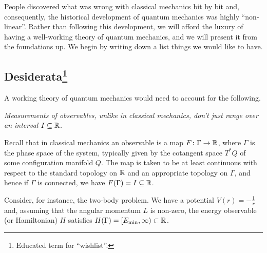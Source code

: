 
People discovered what was wrong with classical mechanics bit by bit and, consequently, the historical development of quantum mechanics was highly ``non-linear''. Rather than following this development, we will afford the luxury of having a well-working theory of quantum mechanics, and we will present it from the foundations up. We begin by writing down a list things we would like to have. 
\subsection[Desiderata]{Desiderata\protect\footnote{Educated term for ``wishlist''.}}

A working theory of quantum mechanics would need to account for the following.

\ben[label=(\alph*)]
\item \textit{Measurements of observables, unlike in classical mechanics, don't just range over an interval $I\subseteq \mathbb{R}$.}

Recall that in classical mechanics an observable is a map $F\colon\Gamma\to\mathbb{R}$, where $\Gamma$ is the phase space of the system, typically given by the cotangent space $T^*Q$ of some configuration manifold $Q$. The map is taken to be at least continuous with respect to the standard topology on $\mathbb{R}$ and an appropriate topology on $\Gamma$, and hence if $\Gamma$ is connected, we have $F(\Gamma)=I\subseteq\mathbb{R}$.

Consider, for instance, the two-body problem. We have a potential $V(r)=-\tfrac{1}{r}$ and, assuming that the angular momentum $L$ is non-zero, the energy observable (or Hamiltonian) $H$ satisfies $H(\Gamma)=[E_{\mathrm{min}},\infty)\subset \mathbb{R}$.

